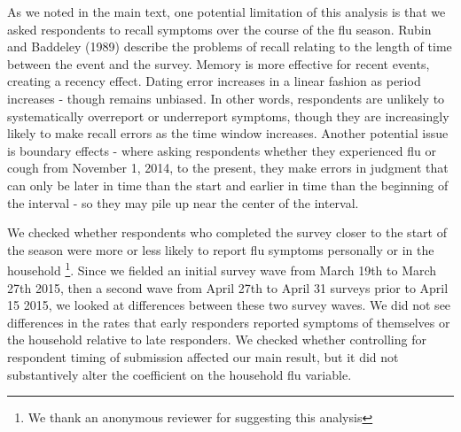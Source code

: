 \documentclass[12pt]{article}
\begin{document}
As we noted in the main text, one potential limitation of this analysis is that we asked respondents to recall symptoms over the course of the flu season. Rubin and Baddeley (1989) describe the problems of recall relating to the length of time between the event and the survey. Memory is more effective for recent events, creating a recency effect. Dating error increases in a linear fashion as period increases - though remains unbiased. In other words, respondents are unlikely to systematically overreport or underreport symptoms, though they are increasingly likely to make recall errors as the time window increases. Another potential issue is boundary effects - where asking respondents whether they experienced flu or cough from November 1, 2014, to the present, they make errors in judgment that can only be later in time than the start and earlier in time than the beginning of the interval - so they may pile up near the center of the interval. 

We checked whether respondents who completed the survey closer to the start of the season were more or less likely to report flu symptoms personally or in the household \footnote{We thank an anonymous reviewer for suggesting this analysis}. Since we fielded an initial survey wave from March 19th to March 27th 2015, then a second wave from April 27th to April 31 surveys prior to April 15 2015, we looked at differences between these two survey waves. We did not see differences in the rates that early responders reported symptoms of themselves or the household relative to late responders. We checked whether controlling for respondent timing of submission affected our main result, but it did not substantively alter the coefficient on the household flu variable. 
\end{document}
